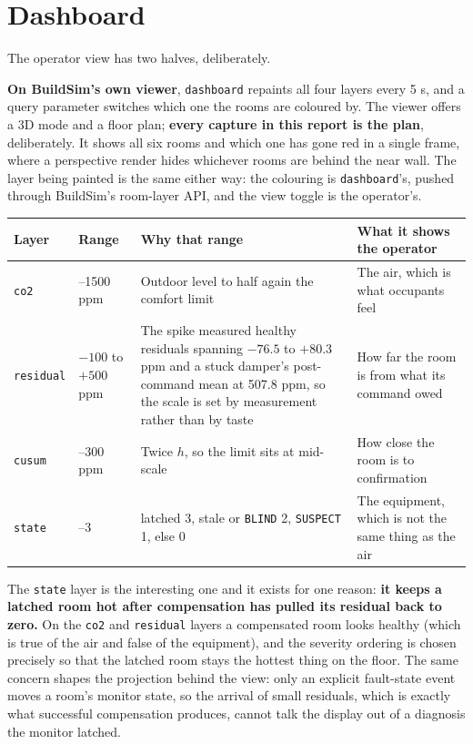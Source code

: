 \section{Dashboard}\label{sec:12}

The operator view has two halves, deliberately.

\textbf{On BuildSim's own viewer}, \texttt{dashboard} repaints all four layers every 5 s, and a
query parameter switches which one the rooms are coloured by. The viewer offers a 3D mode and a
floor plan; \textbf{every capture in this report is the plan}, deliberately. It shows all six
rooms and which one has gone red in a single frame, where a perspective render hides whichever
rooms are behind the near wall. The layer being painted is the same either way: the colouring is
\texttt{dashboard}'s, pushed through BuildSim's room-layer API, and the view toggle is the
operator's.

\begin{longtable}[]{@{}
  >{\raggedright\arraybackslash}p{}
  >{\raggedright\arraybackslash}p{}
  >{\raggedright\arraybackslash}p{}
  >{\raggedright\arraybackslash}p{}@{}}
\toprule
\textbf{Layer} & \textbf{Range} & \textbf{Why that range} & \textbf{What it shows the operator} \\
\midrule
\endhead
\texttt{co2} & 420–1500 ppm & Outdoor level to half again the comfort limit & The air, which is what
occupants feel\\*
\texttt{residual} & $-100$ to $+500$ ppm & The spike measured healthy residuals spanning $-76.5$ to
$+80.3$ ppm and a stuck damper's post-command mean at 507.8 ppm, so the scale is set by measurement
rather than by taste & How far the room is from what its command owed\\*
\texttt{cusum} & 0–300 ppm & Twice $h$, so the limit sits at mid-scale & How close the room is to
confirmation\\*
\texttt{state} & 0–3 & latched 3, stale or \texttt{BLIND} 2, \texttt{SUSPECT} 1, else 0 & The
equipment, which is not the same thing as the air \\
\bottomrule
\end{longtable}

The \texttt{state} layer is the interesting one and it exists for one reason: \textbf{it keeps a
latched room hot after compensation has pulled its residual back to zero.} On the \texttt{co2} and
\texttt{residual} layers a compensated room looks healthy (which is true of the air and false of
the equipment), and the severity ordering is chosen precisely so that the latched room stays the
hottest thing on the floor. The same concern shapes the projection behind the view: only an explicit
fault-state event moves a room's monitor state, so the arrival of small residuals, which is exactly
what successful compensation produces, cannot talk the display out of a diagnosis the monitor
latched.

